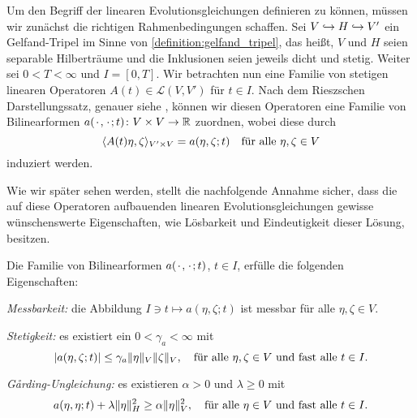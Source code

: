 Um den Begriff der linearen Evolutionsgleichungen definieren zu können, müssen wir zunächst die richtigen Rahmenbedingungen schaffen.
Sei $V \denseinclusion H \denseinclusion V'$ ein Gelfand-Tripel im Sinne von \cref{definition:gelfand_tripel}, das heißt, $V$ und $H$ seien separable Hilberträume und die Inklusionen seien jeweils dicht und stetig.
Weiter sei $0 < T < \infty$ und $I = [0, T]$.
Wir betrachten nun eine Familie von stetigen linearen Operatoren $A(t) \in \mathcal L(V, V')$ für $t \in I$.
Nach dem Rieszschen Darstellungssatz, genauer siehe \cite[Theorem \S{}22.1]{Halmos:1957vd}, können wir diesen Operatoren eine Familie von Bilinearformen $a(\blank, \blank; t) \colon V \times V \to \mathbb{R}$ zuordnen, wobei diese durch
\begin{equation}
    \skp{A(t)\eta}{\zeta}{V' \times V} = a(\eta, \zeta; t) \quad \fa \eta, \zeta \in V
\end{equation}
induziert werden.

Wie wir später sehen werden, stellt die nachfolgende Annahme sicher, dass die auf diese Operatoren aufbauenden linearen Evolutionsgleichungen gewisse wünschenswerte Eigenschaften, wie Lösbarkeit und Eindeutigkeit dieser Lösung, besitzen.

\begin{Annahme}
\label{annahme:eigenschaften_der_bilinearform_a}
    Die Familie von Bilinearformen $a(\blank, \blank; t)$, $t \in I$, erfülle die folgenden Eigenschaften:
    \leavevmode
    \begin{thmenumerate}
        \item \emph{Messbarkeit:} die Abbildung $I \ni t \mapsto a(\eta, \zeta; t)$ ist messbar für alle $\eta, \zeta \in V$.
        \item \emph{Stetigkeit:}
        es existiert ein $0 < \gamma_{a} < \infty$ mit
        \begin{equation}
            \label{eq:eigenschaften_der_bilinearform_a:stetigkeit}
            \abs{a(\eta, \zeta; t)} \leq \gamma_{a} \norm{\eta}_{V} \norm{\zeta}_{V}, \quad \fa \eta, \zeta \in V \text{ und fast alle } t \in I.
        \end{equation}
        \item \emph{G\r{a}rding-Ungleichung:}
        es existieren $\alpha > 0$ und $\lambda \geq 0$ mit
        \begin{equation}
            \label{eq:eigenschaften_der_bilinearform_a:garding}
            a(\eta, \eta; t) + \lambda \norm{\eta}_{H}^{2} \geq \alpha \norm{\eta}_{V}^{2}, \quad \fa \eta \in V \text{ und fast alle } t \in I.
        \end{equation}
    \end{thmenumerate}
\end{Annahme}

